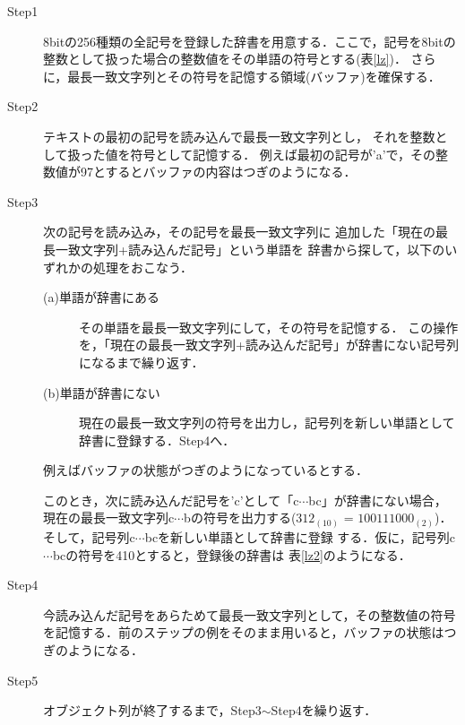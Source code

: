 \begin{description}
	\item [Step1] 8bitの256種類の全記号を登録した辞書を用意する．ここで，記号を8bitの整数として扱った場合の整数値をその単語の符号とする(表\ref{lz})．
	さらに，最長一致文字列とその符号を記憶する領域(バッファ)を確保する．

	\item [Step2] テキストの最初の記号を読み込んで最長一致文字列とし，
	それを整数として扱った値を符号として記憶する．
	例えば最初の記号が'a'で，その整数値が97とするとバッファの内容はつぎのようになる．

	\item [Step3] 次の記号を読み込み，その記号を最長一致文字列に
	追加した「現在の最長一致文字列+読み込んだ記号」という単語を
	辞書から探して，以下のいずれかの処理をおこなう．
	\begin{description}
		\item [(a)単語が辞書にある]
		その単語を最長一致文字列にして，その符号を記憶する．
		この操作を，「現在の最長一致文字列+読み込んだ記号」が辞書にない記号列になるまで繰り返す．
		\item [(b)単語が辞書にない]現在の最長一致文字列の符号を出力し，記号列を新しい単語として辞書に登録する．Step4へ．
	\end{description}
	例えばバッファの状態がつぎのようになっているとする．


	このとき，次に読み込んだ記号を'c'として「c$\cdots$bc」が辞書にない場合，
	現在の最長一致文字列c$\cdots$bの符号を出力する($312_{(10)}$ = $100111000_{(2)}$)．そして，記号列c$\cdots$bcを新しい単語として辞書に登録
	する．仮に，記号列c$\cdots$bcの符号を410とすると，登録後の辞書は
	表\ref{lz2}のようになる．

	\item [Step4] 今読み込んだ記号をあらためて最長一致文字列として，その整数値の符号を記憶する．前のステップの例をそのまま用いると，バッファの状態はつぎのようになる．


	\item [Step5] オブジェクト列が終了するまで，Step3$\sim$Step4を繰り返す．

\end{description}

